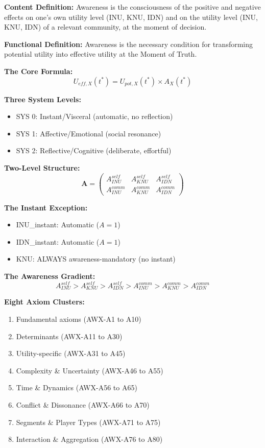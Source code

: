\begin{tcolorbox}[colback=gray!5!white, colframe=gray!75!black, title=Chapter 11 Summary: Awareness]

\textbf{Content Definition:}
Awareness is the consciousness of the positive and negative effects on one's 
own utility level (INU, KNU, IDN) and on the utility level (INU, KNU, IDN) 
of a relevant community, at the moment of decision.

\textbf{Functional Definition:}
Awareness is the necessary condition for transforming potential utility 
into effective utility at the Moment of Truth.

\textbf{The Core Formula:}
$$U_{eff,X}(t^*) = U_{pot,X}(t^*) \times A_X(t^*)$$

\textbf{Three System Levels:}
\begin{itemize}
\item SYS 0: Instant/Visceral (automatic, no reflection)
\item SYS 1: Affective/Emotional (social resonance)
\item SYS 2: Reflective/Cognitive (deliberate, effortful)
\end{itemize}

\textbf{Two-Level Structure:}
$$\mathbf{A} = \begin{pmatrix} A^{self}_{INU} & A^{self}_{KNU} & A^{self}_{IDN} \\ A^{comm}_{INU} & A^{comm}_{KNU} & A^{comm}_{IDN} \end{pmatrix}$$

\textbf{The Instant Exception:}
\begin{itemize}
\item INU\_instant: Automatic ($A = 1$)
\item IDN\_instant: Automatic ($A = 1$)
\item KNU: ALWAYS awareness-mandatory (no instant)
\end{itemize}

\textbf{The Awareness Gradient:}
$$A^{self}_{INU} > A^{self}_{KNU} > A^{self}_{IDN} > A^{comm}_{INU} > A^{comm}_{KNU} > A^{comm}_{IDN}$$

\textbf{Eight Axiom Clusters:}
\begin{enumerate}
\item Fundamental axioms (AWX-A1 to A10)
\item Determinants (AWX-A11 to A30)
\item Utility-specific (AWX-A31 to A45)
\item Complexity \& Uncertainty (AWX-A46 to A55)
\item Time \& Dynamics (AWX-A56 to A65)
\item Conflict \& Dissonance (AWX-A66 to A70)
\item Segments \& Player Types (AWX-A71 to A75)
\item Interaction \& Aggregation (AWX-A76 to A80)
\end{enumerate}


\end{tcolorbox}
